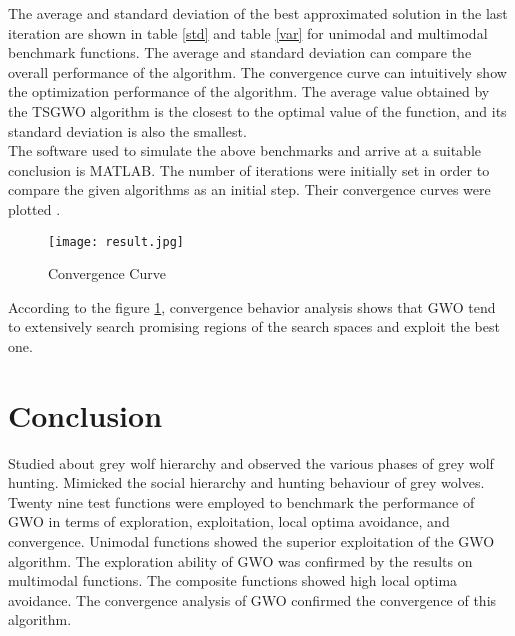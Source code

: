 \documentclass[11pt]{report}
\begin{document}
The average and standard deviation of the best approximated solution in
the last iteration are shown in table \ref{std} and table \ref{var} for unimodal and multimodal benchmark functions. The average and
standard deviation can compare the overall performance of the algorithm.  The convergence curve can intuitively show the
optimization performance of the algorithm.  The average value obtained
by the TSGWO algorithm is the closest to the optimal
value of the function, and its standard deviation is also the
smallest.
\\
The software used to simulate the above benchmarks and arrive at a suitable conclusion is MATLAB. The number of iterations were initially set in order to compare the given algorithms as an initial step. Their convergence curves were plotted \cite{one} \cite{two}.
\begin{figure}[!h]
\begin{center}
     \texttt{[image: result.jpg]}
     \caption {Convergence Curve }
     \label{cc}
\end{center}
\end{figure}
According to the figure \ref{cc}, convergence behavior analysis shows that  GWO tend to extensively search promising regions of the search spaces and exploit the best one.

\chapter{Conclusion}
Studied about grey wolf hierarchy and observed the various phases of grey wolf hunting.
Mimicked the social hierarchy and hunting behaviour of grey wolves.
Twenty nine test functions were employed to benchmark the performance of GWO in terms of exploration, exploitation, local optima  avoidance,  and  convergence.
Unimodal functions showed the superior exploitation of the GWO algorithm. 
The exploration ability of GWO  was  confirmed  by  the  results  on  multimodal  functions.  
The  composite  functions showed high local optima avoidance. 
The convergence analysis of GWO confirmed the convergence of this algorithm. 



\cite{one}
\cite{two}
\cite{three}
\cite{four}
\cite{five}

%
\end{document}
